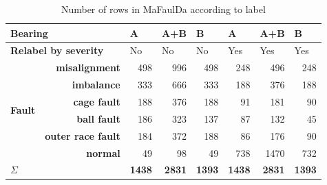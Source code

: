 \begin{table}[h]
\renewcommand{\arraystretch}{1.2}
\centering
\begin{tabular}{|lr|r|r|r|r|r|r|}
\hline
\multicolumn{2}{|l|}{\textbf{Bearing}}                                            & \multicolumn{1}{l|}{A}  & \multicolumn{1}{l|}{A+B} & \multicolumn{1}{l|}{B}  & \multicolumn{1}{l|}{A}   & \multicolumn{1}{l|}{A+B} & \multicolumn{1}{l|}{B}   \\ \hline
\multicolumn{2}{|l|}{\textbf{Relabel by severity}}                                & \multicolumn{1}{l|}{No} & \multicolumn{1}{l|}{No}  & \multicolumn{1}{l|}{No} & \multicolumn{1}{l|}{Yes} & \multicolumn{1}{l|}{Yes} & \multicolumn{1}{l|}{Yes} \\ \hline
\multicolumn{1}{|l|}{\multirow{6}{*}{\textbf{Fault}}} & \textbf{misalignment}     & 498                     & 996                      & 498                     & 248                      & 496                      & 248                      \\ \cline{2-8} 
\multicolumn{1}{|l|}{}                                & \textbf{imbalance}        & 333                     & 666                      & 333                     & 188                      & 376                      & 188                      \\ \cline{2-8} 
\multicolumn{1}{|l|}{}                                & \textbf{cage fault}       & 188                     & 376                      & 188                     & 91                       & 181                      & 90                       \\ \cline{2-8} 
\multicolumn{1}{|l|}{}                                & \textbf{ball fault}       & 186                     & 323                      & 137                     & 87                       & 132                      & 45                       \\ \cline{2-8} 
\multicolumn{1}{|l|}{}                                & \textbf{outer race fault} & 184                     & 372                      & 188                     & 86                       & 176                      & 90                       \\ \cline{2-8} 
\multicolumn{1}{|l|}{}                                & \textbf{normal}           & 49                      & 98                       & 49                      & 738                      & 1470                     & 732                      \\ \hline
\multicolumn{2}{|l|}{$\Sigma$}                                                    & \textbf{1438}           & \textbf{2831}            & \textbf{1393}           & \textbf{1438}            & \textbf{2831}            & \textbf{1393}            \\ \hline
\end{tabular}
\caption{Number of rows in MaFaulDa according to label}
\end{table}

